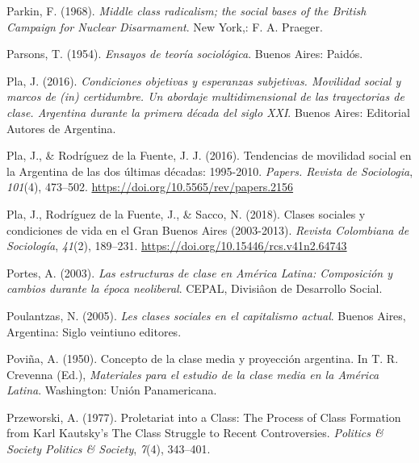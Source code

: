 \documentclass[
]{article}
\newlength{\cslhangindent}
\newlength{\cslentryspacingunit} %
\newenvironment{CSLReferences}[2] %
 {%
  \setlength{\parindent}{0pt}
  \ifodd #1
  \let\oldpar\par
  \def\par{\hangindent=\cslhangindent\oldpar}
  \fi
  \setlength{\parskip}{#2\cslentryspacingunit}
 }%
 {}
\begin{document}
\begin{CSLReferences}{1}{0}
\leavevmode{}%
Parkin, F. (1968). \emph{Middle class radicalism; the social bases of the {British} {Campaign} for {Nuclear} {Disarmament}}. New York,: F. A. Praeger.

\leavevmode{}%
Parsons, T. (1954). \emph{Ensayos de teoría sociológica}. Buenos Aires: Paidós.

\leavevmode{}%
Pla, J. (2016). \emph{Condiciones objetivas y esperanzas subjetivas. {Movilidad} social y marcos de (in) certidumbre. {Un} abordaje multidimensional de las trayectorias de clase. {Argentina} durante la primera década del siglo {XXI}}. Buenos Aires: Editorial Autores de Argentina.

\leavevmode{}%
Pla, J., \& Rodríguez de la Fuente, J. J. (2016). Tendencias de movilidad social en la {Argentina} de las dos últimas décadas: 1995-2010. \emph{Papers. Revista de Sociologia}, \emph{101}(4), 473--502. \url{https://doi.org/10.5565/rev/papers.2156}

\leavevmode{}%
Pla, J., Rodríguez de la Fuente, J., \& Sacco, N. (2018). Clases sociales y condiciones de vida en el {Gran} {Buenos} {Aires} (2003-2013). \emph{Revista Colombiana de Sociología}, \emph{41}(2), 189--231. \url{https://doi.org/10.15446/rcs.v41n2.64743}

\leavevmode{}%
Portes, A. (2003). \emph{Las estructuras de clase en {América} {Latina}: Composición y cambios durante la época neoliberal}. CEPAL, Divisiâon de Desarrollo Social.

\leavevmode{}%
Poulantzas, N. (2005). \emph{Les clases sociales en el capitalismo actual}. Buenos Aires, Argentina: Siglo veintiuno editores.

\leavevmode{}%
Poviña, A. (1950). Concepto de la clase media y proyección argentina. In T. R. Crevenna (Ed.), \emph{Materiales para el estudio de la clase media en la {América} {Latina}}. Washington: Unión Panamericana.

\leavevmode{}%
Przeworski, A. (1977). Proletariat into a {Class}: {The} {Process} of {Class} {Formation} from {Karl} {Kautsky}'s {The} {Class} {Struggle} to {Recent} {Controversies}. \emph{Politics \& Society Politics \& Society}, \emph{7}(4), 343--401.


\end{CSLReferences}
\end{document}

